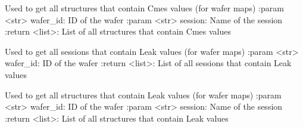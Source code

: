 \documentclass[letterpaper,10pt,english]{sphinxmanual}
\begin{document}
\begin{fulllineitems}
\label{\detokenize{getter:getter.get_Cmes_structures}}
\pysigstartsignatures
{}
\pysigstopsignatures
\sphinxAtStartPar
Used to get all structures that contain Cmes values (for wafer maps)
:param \textless{}str\textgreater{} wafer\_id: ID of the wafer
:param \textless{}str\textgreater{} session: Name of the session
:return \textless{}list\textgreater{}: List of all structures that contain Cmes values

\end{fulllineitems}


\begin{fulllineitems}
\label{\detokenize{getter:getter.get_Leak_sessions}}
\pysigstartsignatures
{}
\pysigstopsignatures
\sphinxAtStartPar
Used to get all sessions that contain Leak values (for wafer maps)
:param \textless{}str\textgreater{} wafer\_id: ID of the wafer
:return \textless{}list\textgreater{}: List of all sessions that contain Leak values

\end{fulllineitems}


\begin{fulllineitems}
\label{\detokenize{getter:getter.get_Leak_structures}}
\pysigstartsignatures
{}
\pysigstopsignatures
\sphinxAtStartPar
Used to get all structures that contain Leak values (for wafer maps)
:param \textless{}str\textgreater{} wafer\_id: ID of the wafer
:param \textless{}str\textgreater{} session: Name of the session
:return \textless{}list\textgreater{}: List of all structures that contain Leak values

\end{fulllineitems}
\end{document}
